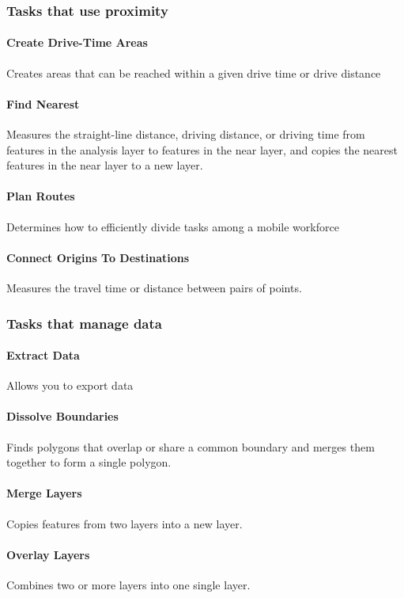 \documentclass{vgtc}                          %
\begin{document}
\subsubsection{Tasks that use proximity}


\paragraph{Create Drive-Time Areas}
Creates areas that can be reached within a given drive time or drive distance
 
\paragraph{Find Nearest}
Measures the straight-line distance, driving distance, or driving time from features in the analysis layer to features in the near layer, and copies the nearest features in the near layer to a new layer.

\paragraph{Plan Routes}
Determines how to efficiently divide tasks among a mobile workforce

\paragraph{Connect Origins To Destinations}
Measures the travel time or distance between pairs of points.


\subsubsection{Tasks that manage data}

\paragraph{Extract Data}
Allows you to export data

\paragraph{Dissolve Boundaries}
Finds polygons that overlap or share a common boundary and merges them together to form a single polygon. 

\paragraph{Merge Layers}
Copies features from two layers into a new layer.
 
\paragraph{Overlay Layers}
Combines two or more layers into one single layer. 





















%
%
\end{document}
